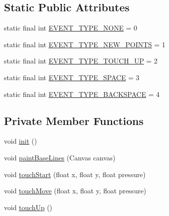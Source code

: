 \subsection*{Static Public Attributes}
\begin{DoxyCompactItemize}
\item 
static final int \hyperlink{classch_1_1zhaw_1_1ba10__bsha__1_1_1ime_1_1PadView_a125bdca474db5a2f392bd3036673abc2}{EVENT\_\-TYPE\_\-NONE} = 0
\item 
static final int \hyperlink{classch_1_1zhaw_1_1ba10__bsha__1_1_1ime_1_1PadView_a25e2262d68474969ad4d9ddd4abf79a9}{EVENT\_\-TYPE\_\-NEW\_\-POINTS} = 1
\item 
static final int \hyperlink{classch_1_1zhaw_1_1ba10__bsha__1_1_1ime_1_1PadView_a09fad18879227b2619c33c071a66523d}{EVENT\_\-TYPE\_\-TOUCH\_\-UP} = 2
\item 
static final int \hyperlink{classch_1_1zhaw_1_1ba10__bsha__1_1_1ime_1_1PadView_af16e51780a0ada3ad00a022717084b41}{EVENT\_\-TYPE\_\-SPACE} = 3
\item 
static final int \hyperlink{classch_1_1zhaw_1_1ba10__bsha__1_1_1ime_1_1PadView_a1383a241ed874fd21ccfb9f661d34c5d}{EVENT\_\-TYPE\_\-BACKSPACE} = 4
\end{DoxyCompactItemize}
\subsection*{Private Member Functions}
\begin{DoxyCompactItemize}
\item 
void \hyperlink{classch_1_1zhaw_1_1ba10__bsha__1_1_1ime_1_1PadView_a7f6b9437957e161e9ddef40f1aff665a}{init} ()
\item 
void \hyperlink{classch_1_1zhaw_1_1ba10__bsha__1_1_1ime_1_1PadView_a86b554f6a4a5fe0023b2c8bac23e32c7}{paintBaseLines} (Canvas canvas)
\item 
void \hyperlink{classch_1_1zhaw_1_1ba10__bsha__1_1_1ime_1_1PadView_aa6c73f1271801bab9f52b52e53ca9c06}{touchStart} (float x, float y, float pressure)
\item 
void \hyperlink{classch_1_1zhaw_1_1ba10__bsha__1_1_1ime_1_1PadView_a04937ec9e314a781c98cad2b080e63df}{touchMove} (float x, float y, float pressure)
\item 
void \hyperlink{classch_1_1zhaw_1_1ba10__bsha__1_1_1ime_1_1PadView_ac4eee83441a5d6f625582acf5a1d7d03}{touchUp} ()
\end{DoxyCompactItemize}
